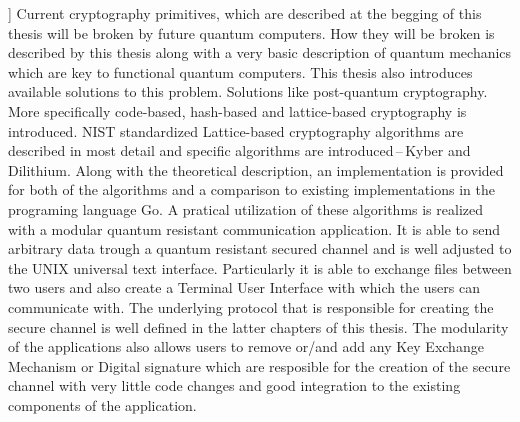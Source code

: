 ]{%
  Current cryptography primitives, which are described at the begging of this thesis will be broken by future quantum computers. How they will be broken is described by this thesis along with a very basic description of quantum mechanics which are key to functional quantum computers. This thesis also introduces available solutions to this problem. Solutions like post-quantum cryptography. More specifically code-based, hash-based and lattice-based cryptography is introduced. NIST standardized Lattice-based cryptography algorithms are described in most detail and specific algorithms are introduced\,--\,Kyber and Dilithium. Along with the theoretical description, an implementation is provided for both of the algorithms and a comparison to existing implementations in the programing language Go. A pratical utilization of these algorithms is realized with a modular quantum resistant communication application. It is able to send arbitrary data trough a quantum resistant secured channel and is well adjusted to the UNIX universal text interface. Particularly it is able to exchange files between two users and also create a Terminal User Interface with which the users can communicate with. The underlying protocol that is responsible for creating the secure channel is well defined in the latter chapters of this thesis. The modularity of the applications also allows users to remove or/and add any Key Exchange Mechanism or Digital signature which are resposible for the creation of the secure channel with very little code changes and good integration to the existing components of the application.
}


%
